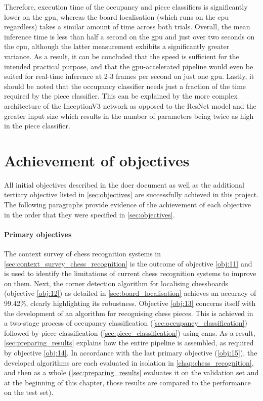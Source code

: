 \documentclass[../report.tex]{subfiles}
\begin{document}
Therefore, execution time of the occupancy and piece classifiers is significantly lower on the \gls{gpu}, whereas the board localisation (which runs on the \gls{cpu} regardless) takes a similar amount of time across both trials. 
Overall, the mean inference time is less than half a second on the \gls{gpu} and just over two seconds on the \gls{cpu}, although the latter measurement exhibits a significantly greater variance.
As a result, it can be concluded that the speed is sufficient for the intended practical purpose, and that the \gls{gpu}-accelerated pipeline would even be suited for real-time inference at 2-3 frames per second on just one \gls{gpu}.
Lastly, it should be noted that the occupancy classifier needs just a fraction of the time required by the piece classifier.
This can be explained by the more complex architecture of the InceptionV3 network as opposed to the ResNet model and the greater input size which results in the number of parameters being twice as high in the piece classifier.

\section{Achievement of objectives}
\label{sec:achievement_of_objectives}
All initial objectives described in the \gls{doer} document as well as the additional tertiary objective listed in \cref{sec:objectives} are successfully achieved in this project.
The following paragraphs provide evidence of the achievement of each objective in the order that they were specified in \cref{sec:objectives}.

\paragraph{Primary objectives}
The context survey of chess recognition systems in \cref{sec:context_survey_chess_recognition} is the outcome of objective \ref{obj:11} and is used to identify the limitations of current chess recognition systems to improve on them.
Next, the corner detection algorithm for localising chessboards (objective \ref{obj:12}) as detailed in \cref{sec:board_localisation} achieves an accuracy of 99.42\%, clearly highlighting its robustness.
Objective \ref{obj:13} concerns itself with the development of an algorithm for recognising chess pieces.
This is achieved in a two-stage process of occupancy classification (\cref{sec:occupancy_classification}) followed by piece classification (\cref{sec:piece_classification}) using \glspl{cnn}.
As a result, \cref{sec:preparing_results} explains how the entire pipeline is assembled, as required by objective \ref{obj:14}.
In accordance with the last primary objective (\ref{obj:15}), the developed algorithms are each evaluated in isolation in \cref{chap:chess_recognition}, and then as a whole (\cref{sec:preparing_results} evaluates it on the validation set and at the beginning of this chapter, those results are compared to the performance on the test set).
\end{document}

